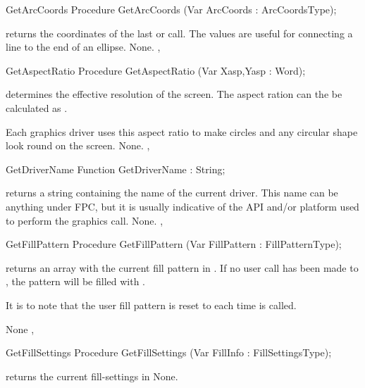 \begin{procedure}{GetArcCoords}
\Declaration
Procedure GetArcCoords (Var ArcCoords : ArcCoordsType);

\Description
{} returns the coordinates of the last  or
 call. The values are useful for connecting a line to
the end of an ellipse.
\Errors
None.
\SeeAlso
{}, 
\end{procedure}

\begin{procedure}{GetAspectRatio}
\Declaration
Procedure GetAspectRatio (Var Xasp,Yasp : Word);

\Description
{} determines the effective resolution of the screen. The aspect ration can
the be calculated as .

Each graphics driver uses this aspect ratio to make circles and any circular
shape look round on the screen.
\Errors
None.
\SeeAlso
{},
\end{procedure}


\begin{function}{GetDriverName}
\Declaration
Function GetDriverName  : String;

\Description
{} returns a string containing the name of the
current driver. This name can be anything under FPC, but it is
usually indicative of the API and/or platform used to perform the
graphics call.
\Errors
None.
\SeeAlso
{}, 
\end{function}

\begin{procedure}{GetFillPattern}
\Declaration
Procedure GetFillPattern (Var FillPattern : FillPatternType);

\Description
{} returns an array with the current fill pattern in .
If no user call has been made to , the pattern will be
filled with .

It is to note that the user fill pattern is reset to  each time
 is called.

\Errors
None
\SeeAlso
{}, 
\end{procedure}

\begin{procedure}{GetFillSettings}
\Declaration
Procedure GetFillSettings (Var FillInfo : FillSettingsType);

\Description
{} returns the current fill-settings in
\Errors
None.
\SeeAlso
{}
\end{procedure}

